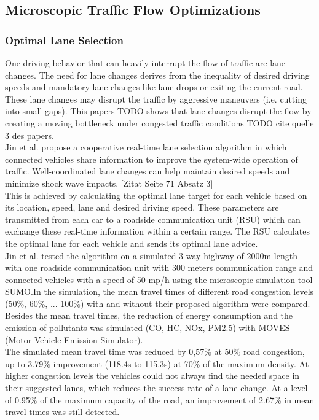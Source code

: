 \documentclass{sig-alternate}
\begin{document}
\subsection{Microscopic Traffic Flow Optimizations}
\subsubsection{Optimal Lane Selection}
One driving behavior that can heavily interrupt the flow of traffic are lane changes. The need for lane changes derives from the inequality of desired driving speeds and mandatory lane changes like lane drops or exiting the current road. These lane changes may disrupt the traffic by aggressive maneuvers (i.e. cutting into small gaps). This papers TODO shows that lane changes disrupt the flow by creating a moving bottleneck under congested traffic conditions TODO cite quelle 3 des papers. \\
Jin et al.\cite{6856515} propose a cooperative real-time lane selection algorithm in which connected vehicles share information to improve the system-wide operation of traffic. Well-coordinated lane changes can help maintain desired speeds and minimize shock wave impacts.  [Zitat Seite 71 Absatz 3] \\
This is achieved by calculating the optimal lane target for each vehicle based on its location, speed, lane and desired driving speed. These parameters are transmitted from each car to a roadside communication unit (RSU) which can exchange these real-time information within a certain range. The RSU calculates the optimal lane for each vehicle and sends its optimal lane advice. \\
Jin et al.\cite{6856515} tested the algorithm on a simulated 3-way highway of 2000m length with one roadside communication unit with 300 meters communication range and connected vehicles with a speed of 50 mp/h using the microscopic simulation tool SUMO\cite{sumo}.In the simulation, the mean travel times of different road congestion levels (50\%, 60\%, ... 100\%) with and without their proposed algorithm were compared. Besides the mean travel times, the reduction of energy consumption and the emission of pollutants was simulated (CO, HC, NOx, PM2.5) with MOVES\cite{simulator2010user} (Motor Vehicle Emission Simulator).\\
The simulated mean travel time was reduced by 0,57\% at 50\% road congestion, up to 3.79\% improvement (118.4s to 115.3s) at 70\% of the maximum density. At higher congestion levels the vehicles could not always find the needed space in their suggested lanes, which reduces the success rate of a lane change. At a level of 0.95\% of the maximum capacity of the road, an improvement of 2.67\% in mean travel times was still detected. \\
\end{document}
